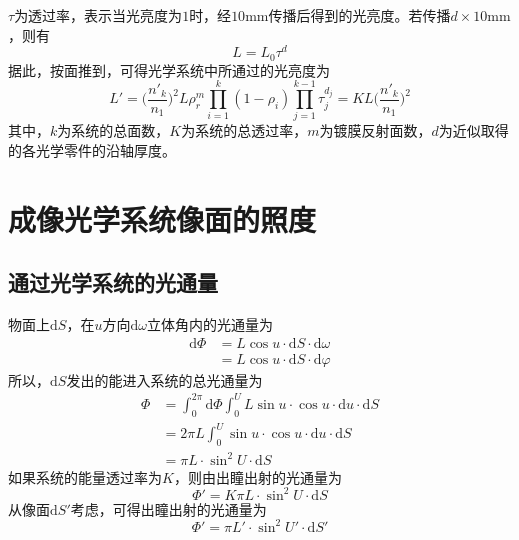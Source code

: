 \documentclass[cn,10pt,chinesefont=founder,math=newtx,cite=super,twoside]{elegantbook}
\begin{document}
$\tau$为透过率，表示当光亮度为$1$时，经$10\mathrm{mm}$传播后得到的光亮度。若传播$d\times10\mathrm{mm}$，则有
\begin{equation}
L=L_0\tau^d
\end{equation}
据此，按面推到，可得光学系统中所通过的光亮度为
\begin{equation}
L'=\bigg(\frac{n'_k}{n_1}\bigg)^2L\rho^m_r\prod^k_{i=1}(1-\rho_i)\prod^{k-1}_{j=1}\tau^{d_j}_{j}=KL\bigg(\frac{n'_k}{n_1}\bigg)^2
\end{equation}
其中，$k$为系统的总面数，$K$为系统的总透过率，$m$为镀膜反射面数，$d$为近似取得的各光学零件的沿轴厚度。

\section{成像光学系统像面的照度}
\subsection{通过光学系统的光通量}
物面上$\mathrm{d}S$，在$u$方向$\mathrm{d}\omega$立体角内的光通量为
\begin{equation}
\begin{aligned}
\mathrm{d}\varPhi&=L\cos u\cdot\mathrm{d}S\cdot\mathrm{d}\omega\\
&=L\cos u\cdot\mathrm{d}S\cdot\mathrm{d}\varphi
\end{aligned}
\end{equation}
所以，$\mathrm{d}S$发出的能进入系统的总光通量为
\begin{equation}
\begin{aligned}
\varPhi&=\int^{2\pi}_0\mathrm{d}\varPhi\int^U_0L\sin u\cdot\cos u\cdot\mathrm{d}u\cdot\mathrm{d}S\\
&=2\pi L\int^U_0\sin u\cdot\cos u\cdot\mathrm{d}u\cdot\mathrm{d}S\\
&=\pi L\cdot\sin^2U\cdot\mathrm{d}S
\end{aligned}
\end{equation}
如果系统的能量透过率为$K$，则由出瞳出射的光通量为
\begin{equation}
\varPhi'=K\pi L\cdot\sin^2U\cdot\mathrm{d}S
\end{equation}
从像面$\mathrm{d}S'$考虑，可得出瞳出射的光通量为
\begin{equation}
\varPhi'=\pi L'\cdot\sin^2U'\cdot\mathrm{d}S'
\end{equation}
\end{document}
